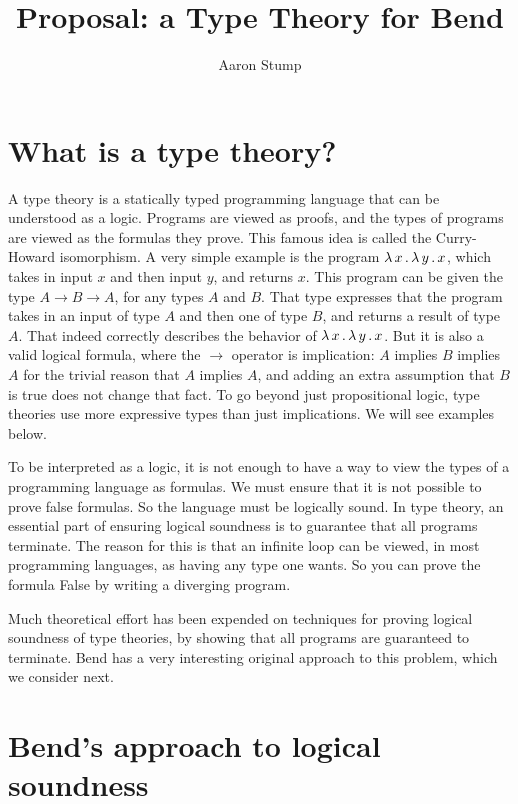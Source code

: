 \documentclass{article}
\begin{document}


\title{Proposal: a Type Theory for Bend}

\author{Aaron Stump}

\maketitle

\section{What is a type theory?}

A type theory is a statically typed programming language that can be
understood as a logic.  Programs are viewed as proofs, and the types
of programs are viewed as the formulas they prove.  This famous idea
is called the Curry-Howard isomorphism.  A very simple example is the
program $\lambda\, x\, .\, \lambda\, y\, .\, x$, which takes in input $x$ and then input
$y$, and returns $x$.  This program can be given the type $A \to B \to
A$, for any types $A$ and $B$.  That type expresses that the program
takes in an input of type $A$ and then one of type $B$, and returns a
result of type $A$.  That indeed correctly describes the behavior of
$\lambda\, x\, .\, \lambda\, y\, .\, x$.  But it is also a valid logical formula, where
the $\to$ operator is implication: $A$ implies $B$ implies $A$ for the
trivial reason that $A$ implies $A$, and adding an extra assumption
that $B$ is true does not change that fact.  To go beyond just
propositional logic, type theories use more expressive types than just
implications.  We will see examples below.

To be interpreted as a logic, it is not enough to have a way
to view the types of a programming language as formulas.  We must
ensure that it is not possible to prove false formulas.  So the
language must be logically sound.  In type theory, an essential part
of ensuring logical soundness is to guarantee that all programs
terminate.  The reason for this is that an infinite loop can be
viewed, in most programming languages, as having any type one wants.
So you can prove the formula \textsf{False} by writing a diverging
program.

Much theoretical effort has been expended on techniques for proving
logical soundness of type theories, by showing that all programs
are guaranteed to terminate.  Bend has a very interesting original
approach to this problem, which we consider next.

\section{Bend's approach to logical soundness}
\end{document}
